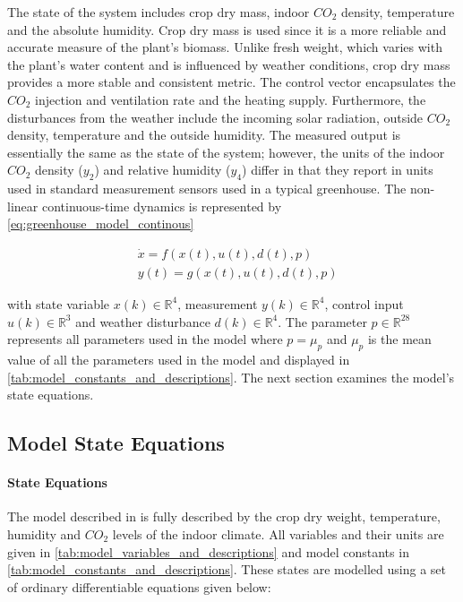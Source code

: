 The state of the system includes crop dry mass, indoor $CO_2$ density, temperature and the absolute humidity. Crop dry mass is used since it is a more reliable and accurate measure of the plant's biomass. Unlike fresh weight, which varies with the plant's water content and is influenced by weather conditions, crop dry mass provides a more stable and consistent metric. The control vector encapsulates the $CO_2$ injection and ventilation rate and the heating supply. Furthermore, the disturbances from the weather include the incoming solar radiation, outside $CO_2$ density, temperature and the outside humidity. The measured output is essentially the same as the state of the system; however, the units of the indoor $CO_2$ density ($y_2$) and relative humidity ($y_4$) differ in that they report in units used in standard measurement sensors used in a typical greenhouse. The non-linear continuous-time dynamics is represented by \autoref{eq:greenhouse_model_continous}

\begin{equation}\label{eq:greenhouse_model_continous}
	\begin{aligned}
		& \dot{x}= f(x(t),u(t),d(t),p) \\
		& y(t) = g(x(t),u(t),d(t),p)
	\end{aligned}
\end{equation}

with state variable $x(k) \in \mathbb{R}^4$, measurement $y(k) \in \mathbb{R}^4$, control input $u(k) \in \mathbb{R}^3$ and weather disturbance $d(k) \in \mathbb{R}^4$. The parameter $p \in \mathbb{R}^{28}$ represents all parameters used in the model where $p=\mu_p$ and $\mu_p$ is the mean value of all the parameters used in the model and displayed in \autoref{tab:model_constants_and_descriptions}. The next section examines the model's state equations.

\subsection {Model State Equations}

\paragraph{State Equations}
The model described in \cite{hentenGreenhouseClimateManagement1994} is fully described by the crop dry weight, temperature, humidity and $CO_2$ levels of the indoor climate. All variables and their units are given in \autoref{tab:model_variables_and_descriptions} and model constants in
\autoref{tab:model_constants_and_descriptions}. These states are modelled using a set of ordinary differentiable equations given below:

